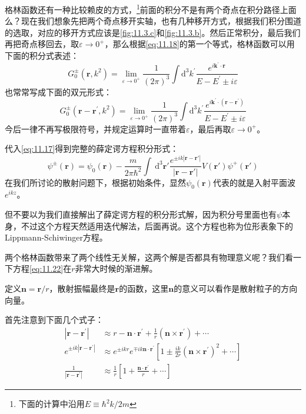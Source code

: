\documentclass[a4paper,zihao=-4,linespread=1]{ctexrep}
\begin{document}
	格林函数还有一种比较赖皮的方式，\footnote{下面的计算中沿用$E\equiv \hbar^2k/2m$}前面的积分不是有两个奇点在积分路径上面么？现在我们想象先把两个奇点移开实轴，也有几种移开方式，根据我们积分围道的选取，对应的移开方式应该是\ref{fig:11.3.c}和\ref{fig:11.3.b}。然后正常积分，最后我们再把奇点移回去，取$\varepsilon\to 0^+$，那么根据\ref{eq:11.18}的第一个等式，格林函数可以用下面的积分式表述：
	\begin{equation}
		\boxed{
			G^{\pm}_0\left(\mathbf{r},k^2\right)=\lim_{\varepsilon\to 0^+}\frac{1}{(2\pi)^3}\int \mathrm{d}^3k^\prime \frac{e^{i\mathbf{k}^\prime\cdot\mathbf{r}}}{E-E^\prime\pm i\varepsilon}
		}
	\end{equation}
	也常常写成下面的双元形式：
	\begin{equation}
		\label{eq:11.21}
		\boxed{
		G^{\pm}_0\left(\mathbf{r}-\mathbf{r}^\prime,k^2\right)=\lim_{\varepsilon\to 0^+}\frac{1}{(2\pi)^3}\int \mathrm{d}^3k^\prime \frac{e^{i\mathbf{k}^\prime\cdot\left(\mathbf{r}-\mathbf{r}^\prime\right)}}{E-E^\prime\pm i\varepsilon}
	}
	\end{equation}
	今后一律不再写极限符号，并规定运算时一直带着$\varepsilon$，最后再取$\varepsilon\to 0^+$。
	
	代入\ref{eq:11.17}得到完整的薛定谔方程积分形式：
	\begin{equation}
		\label{eq:11.22}
		\boxed{\psi^{\pm}(\mathbf{r})={\psi _0}({\mathbf{r}}) - \frac{m}{{2\pi {\hbar ^2}}}\int {\mathrm{~d}^3} {\mathbf{r'}}\frac{{{e^{ \pm ik|{\mathbf{r}} - {\mathbf{r'}}|}}}}{{|{\mathbf{r}} - {\mathbf{r'}}|}}V({\mathbf{r'}}){\psi ^ + }({\mathbf{r'}})}
	\end{equation}
	在我们所讨论的散射问题下，根据初始条件，显然$\psi_0(\mathbf{r})$代表的就是入射平面波$e^{ikz}$。

	但不要以为我们直接解出了薛定谔方程的积分形式解，因为积分号里面也有$\psi$本身，不过这个方程天然适用迭代解法，后面再说。这个方程也称为位形表象下的Lippmann-Schiwinger方程。
	
	两个格林函数带来了两个线性无关解，这两个解是否都具有物理意义呢？我们看一下方程\ref{eq:11.22}在$r$非常大时候的渐进解。
	
	定义$\mathbf{n}=\mathbf{r}/r$，散射振幅最终是$\mathbf{r}$的函数，这里$\mathbf{n}$的意义可以看作是散射粒子的方向向量。
	
	首先注意到下面几个式子：
	\begin{equation}
		\begin{aligned}
			|\mathbf{r}-\mathbf{r}^\prime|&\approx r-\mathbf{n}\cdot\mathbf{r}^\prime+\frac{1}{r}(\mathbf{n}\times\mathbf{r}^\prime)+\cdots\\
			e^{\pm ik|\mathbf{r}-\mathbf{r}^\prime|}&\approx e^{\pm ikr}e^{\mp ik \mathbf{n}\cdot\mathbf{r}^\prime}\left[1\pm\frac{ik}{2r}(\mathbf{n}\times\mathbf{r}^\prime)^2+\cdots\right]\\
			\frac{1}{|\mathbf{r}-\mathbf{r}^\prime|}&\approx\frac{1}{r}\left[1+\frac{\mathbf{n}\cdot\mathbf{r^\prime}}{r}+\cdots\right]
		\end{aligned}
	\end{equation}
\end{document}
